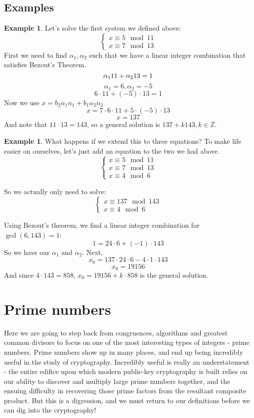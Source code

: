 \documentclass[10pt]{article}
\newcommand{\Z}{\mathbb{Z}}
\theoremstyle{definition}
\newtheorem{ex}[theorem]{Example}
\theoremstyle{remark}
\def\Z{\mathbb{ Z}}
\begin{document}
\subsection{Examples}
\begin{ex}
Let's solve the first system we defined above:
$$\begin{cases}
x \equiv 5 \mod 11\\
x \equiv 7 \mod 13
\end{cases}$$
First we need to find $\alpha_1,\alpha_2$ such that we have a linear integer combination that satisfies Bezout's Theorem.\\
$$\alpha_1 11 + \alpha_2 13 = 1\\$$
$$\alpha_1 = 6, \alpha_2 = -5$$
$$6 \cdot 11 + (-5)\cdot 13 = 1$$
Now we use $x = b_2 \alpha_1 n_1 + b_1 \alpha_2 n_2$
$$x = 7 \cdot 6 \cdot 11 + 5 \cdot (-5) \cdot 13$$
$$x = 137$$
And note that $11 \cdot 13 = 143$, so a general solution is $137 + k143, k \in \Z$.
\end{ex}
\begin{ex}
What happens if we extend this to three equations?  To make life easier on ourselves, let's just add an equation to the two we had above.
$$\begin{cases}
x \equiv 5 \mod 11\\
x \equiv 7 \mod 13\\
x \equiv 4 \mod 6
\end{cases}$$

So we actually only need to solve:
$$\begin{cases}
x \equiv 137 \mod 143\\
x \equiv 4 \mod 6
\end{cases}$$

Using Bezout's theorem, we find a linear integer combination for $\gcd(6,143)=1$:
$$1 = 24 \cdot 6 + (-1) \cdot 143$$
So we have our $\alpha_1$ and $\alpha_2$.  Next,
$$ x_0 = 137 \cdot 24 \cdot 6 - 4 \cdot 1 \cdot 143 $$
$$ x_0 = 19156$$
And since $4 \cdot 143 = 858$, $x_0 = 19156 + k \cdot 858$ is the general solution.
\end{ex}

\section{Prime numbers}
Here we are going to step back from congruences, algorithms and greatest common divisors to focus on one of the most interesting types of integers - prime numbers.  Prime numbers show up in many places, and end up being incredibly useful in the study of cryptography.  Incredibly useful is really an understatement - the entire edifice upon which modern public-key cryptography is built relies on our ability to discover and multiply large prime numbers together, and the ensuing difficulty in recovering those prime factors from the resultant composite product.  But this is a digression, and we must return to our definitions before we can dig into the cryptography!
\end{document}
